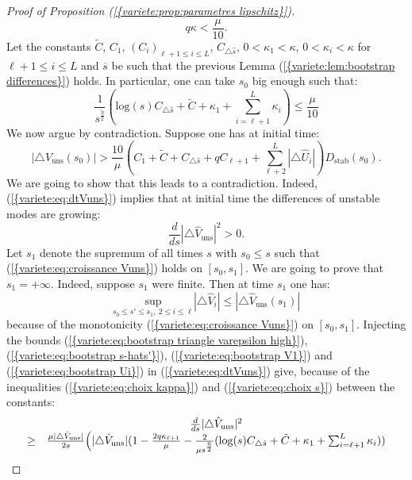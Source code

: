 \documentclass[11pt,a4paper,reqno]{amsart}
\theoremstyle{remark}
\numberwithin{equation}{section}
\begin{document}
\begin{proof}[Proof of Proposition {{\rm (\ref{{variete:prop:parametres lipschitz}})}}]
\begin{equation}
q\kappa<\frac{\mu}{10}.
\end{equation}
Let the constants $\tilde{C}$, $C_1$, $(C_i)_{\ell +1\leq i \leq L}$, $C_{\triangle \hat{s}}$, $0<\kappa_1<\kappa$, $0<\kappa_i<\kappa$ for $\ell+1 \leq i\leq L$ and ${{\overline {s}}}$ be such that the previous Lemma {{\rm (\ref{{variete:lem:bootstrap differences}})}} holds. In particular, one can take $s_0$ big enough such that:
\begin{equation} \label{variete:eq:choix s}
\frac{1}{s^{\frac{\tilde{\eta}}{2}}}(\text{log}(s)C_{\triangle \hat{s}}+\tilde{C}+\kappa_1+\sum_{i=\ell+1}^L \kappa_i)\leq \frac{\mu}{10}
\end{equation}
We now argue by contradiction. Suppose one has at initial time:
\begin{equation} \label{variete:eq:condition initiale Vuns}
|\triangle V_{\text{uns}}(s_0)| > \frac{10}{\mu}(C_1+\tilde{C}+C_{\triangle \hat{s}}+qC_{\ell+1}+\sum_{\ell+2}^L|\triangle \hat{U}_i|)  D_{\text{stab}}(s_0).
\end{equation}
We are going to show that this leads to a contradiction. Indeed, {{\rm (\ref{{variete:eq:dtVuns}})}} implies that at initial time the differences of unstable modes are growing:
\begin{equation} \label{variete:eq:croissance Vuns}
\frac{d}{ds}|\triangle \hat{V}_{\text{uns}}|^2>0.
\end{equation}
Let $s_1$ denote the supremum of all times $s$ with $s_0\leq s$ such that {{\rm (\ref{{variete:eq:croissance Vuns}})}} holds on $[s_0,s_1]$. We are going to prove that $s_1=+\infty$. Indeed, suppose $s_1$ were finite. Then at time $s_1$ one has:
$$
\underset{s_0\leq s' \leq s_1, \ 2\leq i \leq \ell}{\text{sup}}|\triangle \hat{V}_i| \leq |\triangle \hat{V}_{\text{uns}}(s_1)|
$$
because of the monotonicity {{\rm (\ref{{variete:eq:croissance Vuns}})}} on $[s_0,s_1]$. Injecting the bounds {{\rm (\ref{{variete:eq:bootstrap triangle varepsilon high}})}}, {{\rm (\ref{{variete:eq:bootstrap s-hats'}})}}, {{\rm (\ref{{variete:eq:bootstrap V1}})}} and {{\rm (\ref{{variete:eq:bootstrap Ui}})}} in {{\rm (\ref{{variete:eq:dtVuns}})}} give, because of the inequalities {{\rm (\ref{{variete:eq:choix kappa}})}} and {{\rm (\ref{{variete:eq:choix s}})}} between the constants:
$$
\begin{array}{r c l}
&\frac{d}{ds}|\triangle \hat{V}_{\text{uns}}|^2\\
\geq& \frac{\mu|\triangle \hat{V}_{\text{uns}}|}{2s}\Bigl{(}  |\triangle \hat{V}_{\text{uns}}|(1-\frac{2q\kappa_{\ell+1}}{\mu}-\frac{2}{\mu s^{\frac{\tilde{\eta}}{2}}}(\text{log}(s)C_{\triangle \hat{s}}+\tilde{C}+\kappa_1+\sum_{i=\ell+1}^L \kappa_i))\\

\end{array}$$
\end{proof}
\end{document}

